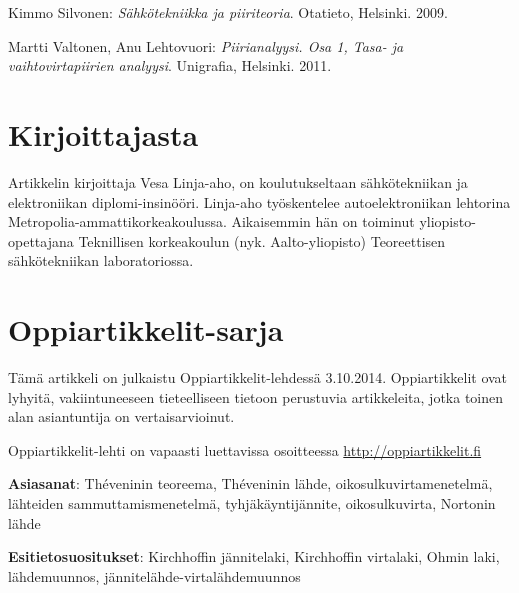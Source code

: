 \documentclass[twocolumn]{article}
\begin{document}
Kimmo Silvonen: {\em Sähkötekniikka ja piiriteoria}. Otatieto, Helsinki. 2009.

Martti Valtonen, Anu Lehtovuori: {\em Piirianalyysi. Osa 1, Tasa- ja vaihtovirtapiirien analyysi}. Unigrafia, Helsinki. 2011.

\section*{Kirjoittajasta}

Artikkelin kirjoittaja Vesa Linja-aho, on koulutukseltaan sähkötekniikan ja elektroniikan diplomi-insinööri. Linja-aho työskentelee autoelektroniikan lehtorina Metropolia-ammattikorkeakoulussa. Aikaisemmin hän on toiminut yliopisto-opettajana Teknillisen korkeakoulun (nyk. Aalto-yliopisto) Teoreettisen sähkötekniikan laboratoriossa.

\section*{Oppiartikkelit-sarja}

Tämä artikkeli on julkaistu Oppiartikkelit-lehdessä 3.10.2014. Oppiartikkelit ovat lyhyitä, vakiintuneeseen tieteelliseen tietoon perustuvia artikkeleita, jotka toinen alan asiantuntija on vertaisarvioinut.

Oppiartikkelit-lehti on vapaasti luettavissa osoitteessa \url{http://oppiartikkelit.fi}

{\bf Asiasanat}: Théveninin teoreema, Théveninin lähde, oikosulkuvirtamenetelmä, lähteiden sammuttamismenetelmä, tyhjäkäyntijännite, oikosulkuvirta, Nortonin lähde

{\bf Esitietosuositukset}: Kirchhoffin jännitelaki, Kirchhoffin virtalaki, Ohmin laki, lähdemuunnos, jännitelähde-virtalähdemuunnos
\end{document}
